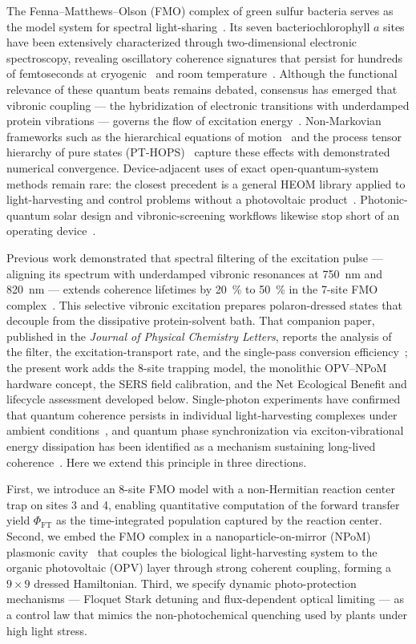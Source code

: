 \documentclass[preprint,12pt]{elsarticle}
\begin{document}
The Fenna--Matthews--Olson (FMO) complex of green sulfur bacteria serves as the model system for spectral light-sharing~\cite{Fenna1974}.
Its seven bacteriochlorophyll $a$ sites have been extensively characterized through two-dimensional electronic spectroscopy, revealing oscillatory coherence signatures that persist for hundreds of femtoseconds at cryogenic~\cite{Engel2007} and room temperature~\cite{Panitchayangkoon2010}.
Although the functional relevance of these quantum beats remains debated, consensus has emerged that vibronic coupling --- the hybridization of electronic transitions with underdamped protein vibrations --- governs the flow of excitation energy~\cite{Chin2013,Christensson2012}.
Non-Markovian frameworks such as the hierarchical equations of motion~\cite{Tanimura1989} and the process tensor hierarchy of pure states (PT-HOPS)~\cite{Varvelo2021,Citty2024} capture these effects with demonstrated numerical convergence. Device-adjacent uses of exact open-quantum-system methods remain rare: the closest precedent is a general HEOM library applied to light-harvesting and control problems without a photovoltaic product~\cite{Lambert2023}. Photonic-quantum solar design and vibronic-screening workflows likewise stop short of an operating device~\cite{LiuFang2026,Motlagh2024}.

Previous work demonstrated that spectral filtering of the excitation pulse --- aligning its spectrum with underdamped vibronic resonances at \qty{750}{\nm} and \qty{820}{\nm} --- extends coherence lifetimes by \qty{20}{\percent} to \qty{50}{\percent} in the 7-site FMO complex~\cite{TeguiaKouam2026}.
This selective vibronic excitation prepares polaron-dressed states that decouple from the dissipative protein-solvent bath. That companion paper, published in the \textit{Journal of Physical Chemistry Letters}, reports the analysis of the filter, the excitation-transport rate, and the single-pass conversion efficiency~\cite{TeguiaKouam2026}; the present work adds the 8-site trapping model, the monolithic OPV--NPoM hardware concept, the SERS field calibration, and the Net Ecological Benefit and lifecycle assessment developed below.
Single-photon experiments have confirmed that quantum coherence persists in individual light-harvesting complexes under ambient conditions~\cite{Li2023}, and quantum phase synchronization via exciton-vibrational energy dissipation has been identified as a mechanism sustaining long-lived coherence~\cite{Zhu2024}.
Here we extend this principle in three directions.

First, we introduce an 8-site FMO model with a non-Hermitian reaction center trap on sites 3 and 4, enabling quantitative computation of the forward transfer yield $\Phi_{\mathrm{FT}}$ as the time-integrated population captured by the reaction center.
Second, we embed the FMO complex in a nanoparticle-on-mirror (NPoM) plasmonic cavity~\cite{Chikkaraddy2016} that couples the biological light-harvesting system to the organic photovoltaic (OPV) layer through strong coherent coupling, forming a $9\times 9$ dressed Hamiltonian.
Third, we specify dynamic photo-protection mechanisms --- Floquet Stark detuning and flux-dependent optical limiting --- as a control law that mimics the non-photochemical quenching used by plants under high light stress.
\end{document}
